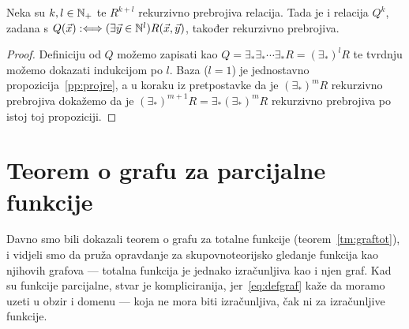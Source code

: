 \begin{korolar}[{name=[višestruka projekcija čuva rekurzivnu prebrojivost]}]\label{kor:projre}
Neka su $k,l\in{\mathbb N}_+$ te $R^{k+l}$ rekurzivno prebrojiva relacija. Tada je i relacija $Q^k$, zadana s $Q(\vec x):\Longleftrightarrow(\exists\vec y\in{\mathbb N}^l)R(\vec x,\vec y)$, također rekurzivno prebrojiva.
\end{korolar}
\begin{proof}
%
Definiciju od $Q$ možemo zapisati kao $Q=\exists_*\exists_*\dotsi\exists_*R=(\exists_*\!)^lR$ te tvrdnju možemo dokazati indukcijom po $l$. Baza ($l=1$) je jednostavno propozicija~\ref{pp:projre}, a u koraku iz pretpostavke da je $(\exists_*\!)^mR$ rekurzivno prebrojiva dokažemo da je $(\exists_*\!)^{m+1}R=\exists_*(\exists_*\!)^mR$ rekurzivno prebrojiva po istoj toj propoziciji.
\end{proof}

\section{Teorem o grafu za parcijalne funkcije}

Davno smo bili dokazali teorem o grafu za totalne funkcije (teorem~\ref{tm:graftot}), i vidjeli smo da pruža opravdanje za skupovnoteorijsko gledanje funkcija kao njihovih grafova --- totalna funkcija je jednako izračunljiva kao i njen graf. Kad su funkcije parcijalne, stvar je  kompliciranija, jer~\eqref{eq:defgraf} kaže da moramo uzeti u obzir i domenu --- koja ne mora biti izračunljiva, čak ni za izračunljive funkcije.

